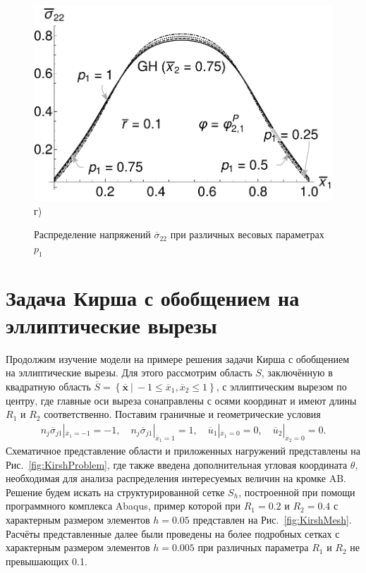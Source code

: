 \begin{figure}[ht]
\begin{minipage}[b][][b]{0.49\linewidth}
        \includegraphics[width=\linewidth]{pics/TStressGH.pdf} \\ г)
    \end{minipage}
    \caption{Распределение напряжений $\overline{\sigma}_{22}$ при различных весовых параметрах $p_1$}
    \label{fig:TSigma}
\end{figure}

\section{Задача Кирша с обобщением на эллиптические вырезы}\label{sec:ResultsAnalysis/KirshProblem}

Продолжим изучение модели на примере решения задачи Кирша с обобщением на эллиптические вырезы. Для этого рассмотрим область $S$, заключённую в квадратную область $\overline{S} = \left\{ \boldsymbol{\overline{x}} \ | \ -1 \leqslant \overline{x}_1, \overline{x}_2 \leqslant 1 \right\}$, с эллиптическим вырезом по центру, где главные оси выреза сонаправлены с осями координат и имеют длины $R_1$ и $R_2$ соответственно. Поставим граничные и геометрические условия
\begin{gather*}
	n_j \overline{\sigma}_{j1} |_{\overline{x}_1 = -1} = -1,
	\quad
	n_j \overline{\sigma}_{j1} |_{\overline{x}_1 = 1} = 1,
	\quad
	\overline{u}_1 |_{\overline{x}_1 = 0} = 0,
	\quad
	\overline{u}_2 |_{\overline{x}_2 = 0} = 0.
\end{gather*}
Схематичное представление области и приложенных нагружений представлены на Рис.~\ref{fig:KirshProblem}, где также введена дополнительная угловая координата $\theta$, необходимая для анализа распределения интересуемых величин на кромке AB. Решение будем искать на структурированной сетке $S_h$, построенной при помощи программного комплекса Abaqus, пример которой при $R_1 = 0.2$ и $R_2 = 0.4$ с характерным размером элементов $h = 0.05$ представлен на Рис.~\ref{fig:KirshMesh}. Расчёты представленные далее были проведены на более подробных сетках с характерным размером элементов $h = 0.005$ при различных параметра $R_1$ и $R_2$ не превышающих 0.1.

